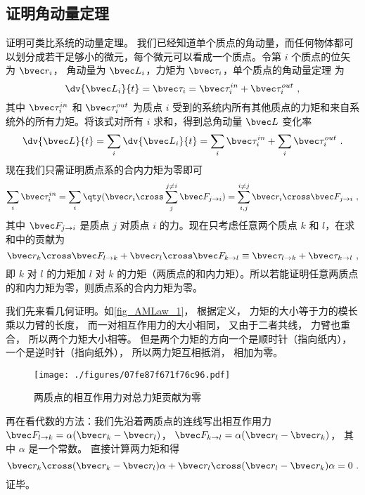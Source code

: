 \subsection{证明角动量定理}
证明可类比系统的动量定理。 我们已经知道单个质点的角动量，而任何物体都可以划分成若干足够小的微元，每个微元可以看成一个质点。令第 $i$ 个质点的位矢为 $\bvec r_i$， 角动量为 $\bvec L_i$，力矩为 $\bvec \tau_i$，单个质点的角动量定理 为
\begin{equation}
\dv{\bvec L_i}{t} = \bvec \tau_i = \bvec \tau_i^{in} + \bvec \tau_i^{out}~,
\end{equation}
其中 $\bvec \tau_i^{in}$ 和 $\bvec \tau_i^{out}$ 为质点 $i$ 受到的系统内所有其他质点的力矩和来自系统外的所有力矩。将该式对所有 $i$ 求和，得到总角动量 $\bvec L$ 变化率
\begin{equation}
\dv{\bvec L}{t} =\sum_i\dv{\bvec L_i}{t} = \sum_i\bvec \tau_i^{in} + \sum_i\bvec \tau_i^{out}~.
\end{equation}
现在我们只需证明质点系的合内力矩为零即可
\begin{equation}
\sum_i\bvec \tau_i^{in} = \sum_i \qty(\bvec r_i\cross\sum_j^{j\ne i}\bvec F_{j\to i}) = \sum_{i,j}^{i\ne j} \bvec r_i\cross\bvec F_{j\to i}~,
\end{equation}
其中 $\bvec F_{j\to i}$ 是质点 $j$ 对质点 $i$ 的力。现在只考虑任意两个质点 $k$ 和 $l$，在求和中的贡献为
\begin{equation}
\bvec r_k\cross\bvec F_{l\to k} + \bvec r_l\cross\bvec F_{k\to l} \equiv \bvec \tau_{l\to k}+ \bvec \tau_{k\to l}~,
\end{equation}
即 $k$ 对 $l$ 的力矩加 $l$ 对 $k$ 的力矩（两质点的和内力矩）。所以若能证明任意两质点的和内力矩为零，则质点系的合内力矩为零。

我们先来看几何证明。如\autoref{fig_AMLaw_1}， 根据定义， 力矩的大小等于力的模长乘以力臂的长度， 而一对相互作用力的大小相同， 又由于二者共线， 力臂也重合， 所以两个力矩大小相等。 但是两个力矩的方向一个是顺时针（指向纸内）， 一个是逆时针（指向纸外）， 所以两力矩互相抵消， 相加为零。

\begin{figure}[ht]
\centering
\texttt{[image: ./figures/07fe87f671f76c96.pdf]}
\caption{两质点的相互作用力对总力矩贡献为零}\label{fig_AMLaw_1}
\end{figure}

再在看代数的方法：我们先沿着两质点的连线写出相互作用力 $\bvec F_{l\to k} = \alpha(\bvec r_k - \bvec r_l)$， $\bvec F_{k\to l} = \alpha(\bvec r_l - \bvec r_k)$， 其中 $\alpha$ 是一个常数。 直接计算两力矩和得
\begin{equation}
\bvec r_k \cross (\bvec r_k - \bvec r_l)\alpha + \bvec r_l \cross (\bvec r_l - \bvec r_k)\alpha = 0~.
\end{equation}
证毕。
